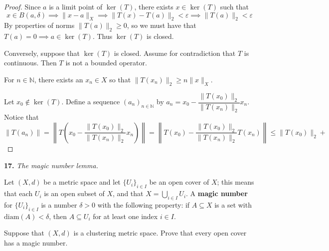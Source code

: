 \documentclass{article}
\newcommand{\diam}{\mathrm{diam}}
\theoremstyle{plain} %
\numberwithin{thm}{section} %
\theoremstyle{definition}
\begin{document}
\begin{enumerate}[label=(\alph*)]
\begin{proof}
            Since \(a\) is a limit point of \(\ker (T)\), there exists \(x \in \ker (T)\) such that
            \[
                x \in B(a, \delta) \implies \|x -a\| _X \implies \|T(x)-T(a)\| _2 < \varepsilon \implies \|T(a)\| _2 < \varepsilon
            \]
            By properties of norms \(\|T(a)\| _2 \geq 0\), so we must have that \(T(a) = 0 \implies a \in \ker (T)\). Thus \(\ker(T)\) is closed.

            Conversely, suppose that \(\ker (T)\) is closed. Assume for contradiction that \(T\) is continuous. Then \(T\) is not a bounded operator.

            For \(n\in\mathbb{N}\), there exists an \(x_n \in X\) so that \(\|T(x_n)\| _2 \geq n\|x\| _X\).

            Let \(x_0 \notin \ker (T)\). Define a sequence \((a_n)_{n\in\mathbb{N}}\) by \(a_n = x_0 - \dfrac{\|T(x_0)\| _2}{\|T(x_n)\| _2}x_n\). Notice that
            \[
                \|T(a_n)\| = \left\lVert T\left(x_0 - \dfrac{\|T(x_0)\| _2}{\|T(x_n)\| _2}x_n\right) \right\rVert = \left\lVert T\left(x_0 \right) - \dfrac{\|T(x_0)\| _2}{\|T(x_n)\| _2} T(x_n) \right\rVert \leq \|T(x_0)\| _2 + 
            \]

        \end{proof}
    \end{enumerate}
    \pagebreak
    \noindent\textbf{17.} \textit{The magic number lemma.}

    Let $(X,d)$ be a metric space and let $\{U_i\}_{i\in I}$ be an open cover of $X$; this means that each $U_i$ is an open subset of $X$, and that $X=\bigcup_{i\in I} U_i$. A \textbf{magic number} for $\{U_i\}_{i\in I}$ is a number $\delta>0$ with the following property: if $A\subseteq X$ is a set with $\diam(A)<\delta$, then $A\subseteq U_i$ for at least one index $i\in I$.

    Suppose that $(X,d)$ is a clustering metric space. Prove that every open cover has a magic number.
\end{document}
